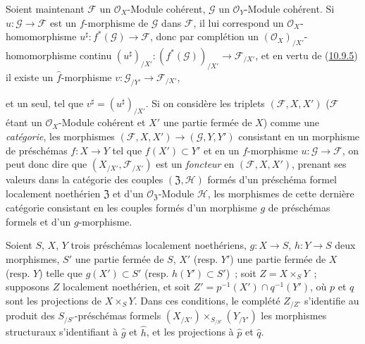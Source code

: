 \begin{env}[10.9.6]
\label{I.10.9.6-fr}
Soient maintenant $\mathscr{F}$ un $\mathscr{O}_X$-Module cohérent,
$\mathscr{G}$ un $\mathscr{O}_Y$-Module cohérent. Si
$u:\mathscr{G}\to\mathscr{F}$ est un $f$-morphisme de $\mathscr{G}$ dans
$\mathscr{F}$, il lui correspond un $\mathscr{O}_X$-homomorphisme
$u^\sharp:f^*(\mathscr{G})\to\mathscr{F}$, donc par complétion un
$(\mathscr{O}_X)_{/X'}$-homomorphisme continu
$(u^\sharp)_{/X'}:(f^*(\mathscr{G}))_{/X'}\to\mathscr{F}_{/X'}$, et en
vertu de (\hyperref[I.10.9.5-fr]{10.9.5}) il existe un
$\widehat f$-morphisme $v:\mathscr{G}_{/Y'}\to\mathscr{F}_{/X'}$,

et un seul, tel que $v^\sharp=(u^\sharp)_{/X'}$. Si on considère les
triplets $(\mathscr{F},X,X')$ ($\mathscr{F}$ étant un
$\mathscr{O}_X$-Module cohérent et $X'$ une partie fermée de $X$) comme
une \emph{catégorie}, les morphismes
$(\mathscr{F},X,X')\to(\mathscr{G},Y,Y')$ consistant en un morphisme de
préschémas $f:X\to Y$ tel que $f(X')\subset Y'$ et en un
$f$-morphisme $u:\mathscr{G}\to\mathscr{F}$, on peut donc dire que
$(X_{/X'},\mathscr{F}_{/X'})$ est un \emph{foncteur} en
$(\mathscr{F},X,X')$, prenant ses valeurs dans la catégorie des couples
$(\mathfrak{Z},\mathscr{H})$ formés d'un préschéma formel localement
noethérien $\mathfrak{Z}$ et d'un
$\mathscr{O}_{\mathfrak{Z}}$-Module $\mathscr{H}$, les morphismes de
cette dernière catégorie consistant en les couples formés d'un morphisme
$g$ de préschémas formels et d'un $g$-morphisme.
\end{env}

\begin{proposition}[10.9.7]
\label{I.10.9.7-fr}
Soient $S$, $X$, $Y$ trois préschémas localement noethériens,
$g:X\to S$, $h:Y\to S$ deux morphismes, $S'$ une partie fermée de $S$,
$X'$ \textup{(resp. $Y'$)} une partie fermée de $X$ \textup{(resp. $Y$)} telle que
$g(X')\subset S'$ \textup{(resp. $h(Y')\subset S'$)}~; soit
$Z=X\times_S Y$~; supposons $Z$ localement noethérien, et soit
$Z'=p^{-1}(X')\cap q^{-1}(Y')$, où $p$ et $q$ sont les projections de
$X\times_S Y$. Dans ces conditions, le complété $Z_{/Z'}$ s'identifie au
produit des $S_{/S'}$-préschémas formels
$(X_{/X'})\times_{S_{/S'}}(Y_{/Y'})$ les morphismes structuraux
s'identifiant à $\widehat g$ et $\widehat h$, et les projections à
$\widehat p$ et $\widehat q$.
\end{proposition}

